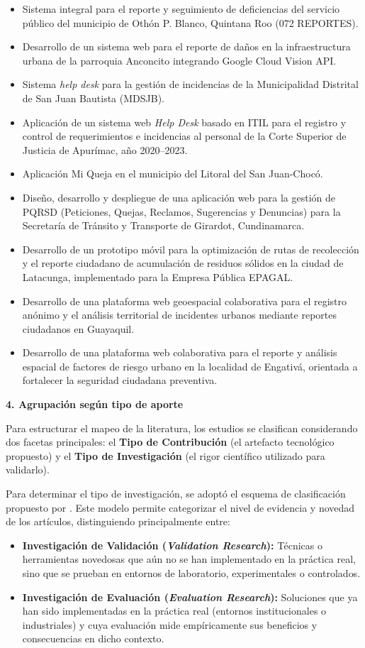 \begin{itemize}
	\item Sistema integral para el reporte y seguimiento de deficiencias del servicio público del municipio de Othón P. Blanco, Quintana Roo (072 REPORTES).
	\item Desarrollo de un sistema web para el reporte de daños en la infraestructura urbana de la parroquia Anconcito integrando Google Cloud Vision API.
	\item Sistema \textit{help desk} para la gestión de incidencias de la Municipalidad Distrital de San Juan Bautista (MDSJB).
	\item Aplicación de un sistema web \textit{Help Desk} basado en ITIL para el registro y control de requerimientos e incidencias al personal de la Corte Superior de Justicia de Apurímac, año 2020--2023.
	\item Aplicación Mi Queja en el municipio del Litoral del San Juan-Chocó.
	\item Diseño, desarrollo y despliegue de una aplicación web para la gestión de PQRSD (Peticiones, Quejas, Reclamos, Sugerencias y Denuncias) para la Secretaría de Tránsito y Transporte de Girardot, Cundinamarca.
	\item Desarrollo de un prototipo móvil para la optimización de rutas de recolección y el reporte ciudadano de acumulación de residuos sólidos en la ciudad de Latacunga, implementado para la Empresa Pública EPAGAL.
	\item Desarrollo de una plataforma web geoespacial colaborativa para el registro anónimo y el análisis territorial de incidentes urbanos mediante reportes ciudadanos en Guayaquil.
	\item Desarrollo de una plataforma web colaborativa para el reporte y análisis espacial de factores de riesgo urbano en la localidad de Engativá, orientada a fortalecer la seguridad ciudadana preventiva.
\end{itemize}


\textbf{4. Agrupación según tipo de aporte}

Para estructurar el mapeo de la literatura, los estudios se clasifican considerando dos facetas principales: el \textbf{Tipo de Contribución} (el artefacto tecnológico propuesto) y el \textbf{Tipo de Investigación} (el rigor científico utilizado para validarlo).

Para determinar el tipo de investigación, se adoptó el esquema de clasificación propuesto por \cite{wieringa2014design}. Este modelo permite categorizar el nivel de evidencia y novedad de los artículos, distinguiendo principalmente entre:
\begin{itemize}
	\item \textbf{Investigación de Validación (\textit{Validation Research}):} Técnicas o herramientas novedosas que aún no se han implementado en la práctica real, sino que se prueban en entornos de laboratorio, experimentales o controlados.
	\item \textbf{Investigación de Evaluación (\textit{Evaluation Research}):} Soluciones que ya han sido implementadas en la práctica real (entornos institucionales o industriales) y cuya evaluación mide empíricamente sus beneficios y consecuencias en dicho contexto.
\end{itemize}


